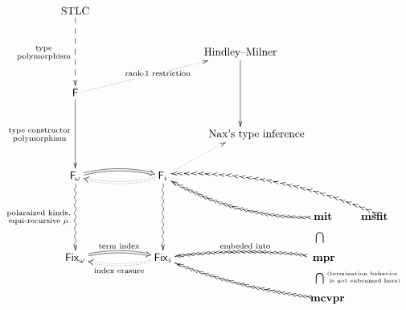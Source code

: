 \centering
$\xymatrix{
 \textrm{STLC}
     \ar@{-->}[dd]_{\begin{smallmatrix}
                      \textrm{type}\\
                      \textrm{polymorphism}
                    \end{smallmatrix}} \\
      &&& \textrm{Hindley--Milner} \ar[dd] & \\
 \F  \ar[dd]_{\begin{smallmatrix}
                \textrm{type constructor} \\
                \textrm{polymorphism}
              \end{smallmatrix}}
     \ar@{.>}[rrru]|{\textrm{rank-1 restriction}}
                &&&& \\
                 &&& \textrm{Nax's type inference\hspace{-3em}} & \\
 \Fw   \ar@/^/@{=>}[rr]
       \ar@{~>}[dd]_{\begin{smallmatrix}
                       \textrm{polaraized kinds,}\\
                       \textrm{equi-recursive } \mu
                     \end{smallmatrix}}
                && \Fi \ar@{~>}[dd] \ar@/^/@{:>}[ll] \ar@{.>}[ru] &&
             \\ &&&& ~ \MIt \;~\phantom{\subset}~~~\; \MsfIt \hspace{-4em}
                            \ar@/^1pc/@{{ }{>}{>}}[llu]
                          & \ar@<-.5ex>@/_1pc/@{{ }{>}{>}}[lllu] \\
 \Fixw \ar@/^/@{=>}[rr]^{\textrm{term index}}
                && \Fixi \ar@/^/@{:>}[ll]^{\textrm{index erasure}}
                  && ~ \MPr \quad
                             \ar@{}[u]^{\bigcap}
			     \ar@/_/@{{ }{>}{>}}[ll]_{\textrm{embeded into}} \\
                  &&&& \McvPr
                             \ar@{}[u]^{\bigcap}
                      \ar@<.5em>@{}[u]_{\begin{smallmatrix}
                                         _\textrm{(termination behavior~}\\
                                         ^\textrm{~is not subsumed here)}
                                        \end{smallmatrix}}
			     \ar@/^/@{{ }{>}{>}}[llu] \\
}$
